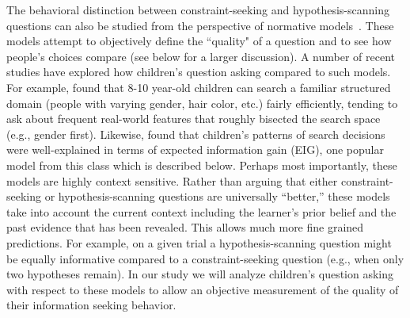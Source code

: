 \documentclass[man,floatsintext]{apa6}
\begin{document}
The behavioral distinction between constraint-seeking and hypothesis-scanning questions can also be studied 
from the perspective of normative models~\cite{Oaksford:1994tw,Nelson:2005ph}.  These models attempt to objectively
define the ``quality" of a question and to see how people's choices compare (see below for a larger discussion). 
A number of recent studies have explored how children's question asking compared to such models.  For example, 
  found that 8-10 year-old children can search a familiar structured domain 
(people with varying gender, hair color, etc.) fairly efficiently, tending to ask about frequent real-world features 
that roughly bisected the search space (e.g., gender first). 
 Likewise,  found that children's patterns of search decisions were well-explained in terms of 
 expected information gain (EIG), one popular model from this class which is described below.
Perhaps most importantly, these models are highly context sensitive.  Rather than arguing that either constraint-seeking
or hypothesis-scanning questions are universally ``better,'' these models take into account the current context including the
learner's prior belief and the past evidence that has been revealed.  This allows much more fine grained predictions.
For example, on a given trial a hypothesis-scanning question might be equally informative compared to a constraint-seeking
question (e.g., when only two hypotheses remain).   In our study we will analyze children's question asking with respect to these
models to allow an objective measurement of the quality of their information seeking behavior.
\end{document}
